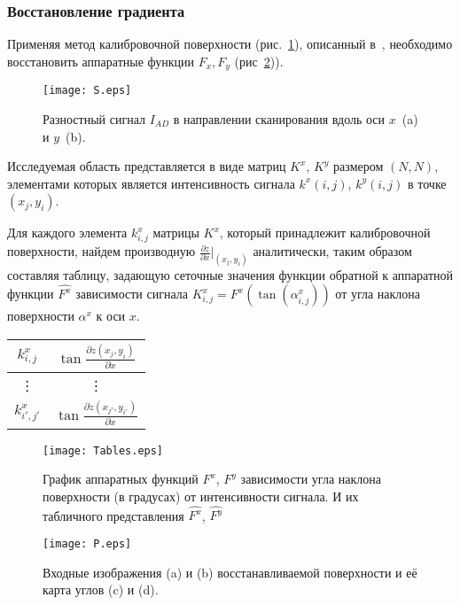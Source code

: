 \documentclass{beamer}
\begin{document}
\begin{frame}[c,allowframebreaks]
    \frametitle{Восстановление градиента}

    Применяя метод калибровочной поверхности (рис.~\ref{fig:inputSphere}), описанный в~\cite{main},
необходимо восстановить аппаратные функции $F_x, F_y$ (рис~\ref{fig:Tables})).

    \begin{figure}[hp]
        \texttt{[image: S.eps]}
        \caption{\small Разностный сигнал $I_{AD}$ в направлении сканирования вдоль
        оси $x$~(a) и $y$~(b).}
        {\label{fig:inputSphere}}%
    \end{figure}

    \framebreak

    Исследуемая область представляется в виде матриц $K^x$, $K^y$ размером $(N,N)$,
элементами которых является интенсивность сигнала $k^x (i,j)$, $k^y (i,j)$ в точке $(x_j, y_i)$.

    Для каждого элемента $k^x_{i,j}$ матрицы $K^x$, который принадлежит калибровочной поверхности,
найдем производную $\frac{\partial z}{\partial x} \big|_{(x_j,y_i)} $ аналитически, таким
образом составляя таблицу, задающую сеточные значения функции обратной к аппаратной функции
$\hat{F^x}$ зависимости сигнала $K^x_{i,j} = F^x (\tan(\alpha^x_{i,j}))$ от угла наклона
поверхности $\alpha^x$ к оси $x$.
    \begin{center}
        \begin{tabular}{| c| c |}
            \hline
            $ k^x_{i,j} $ & $ \tan{ \frac{\partial z(x_j, y_i)}{\partial x} } $ \\
            \hline
            \vdots          & \vdots \\
            \hline
            $ k^x_{i',j'} $ & $ \tan{ \frac{\partial z(x_{j'}, y_{i'})}{\partial x} } $ \\
            \hline
        \end{tabular}
    \end{center}

    \framebreak

    \begin{figure}
        \texttt{[image: Tables.eps]}
        \caption
        {
            График аппаратных функций $F^x$, $F^y$ зависимости угла наклона поверхности
            (в градусах) от интенсивности сигнала. И их табличного представления
            $\hat{F^x}$, $\hat{F^y}$
        }
        {\label{fig:Tables}}%
    \end{figure}

    \framebreak

    \begin{figure}
        \texttt{[image: P.eps]}
        \caption{Входные изображения (a) и (b) восстанавливаемой поверхности и её карта углов (c) и (d).}
        {\label{fig:input_data}}%
    \end{figure}
\end{frame}
\end{document}
